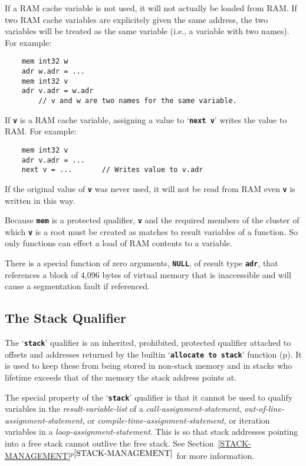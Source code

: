 \documentclass[12pt]{article}
\makeatletter
\newcommand{\TT}[1]{{\tt \bfseries #1}}
\newcommand{\ttkey}[1]{\TT{#1}\index{#1@{\tt #1}}}
\newcommand{\itemref}[1]{\ref{#1}$^{p\pageref{#1}}$}
\newcommand{\pagref}[1]{p\pageref{#1}}
\newenvironment{indpar}[1][0.3in]%
	{\begin{list}{}%
		     {\setlength{\itemsep}{0in}%
		      \setlength{\topsep}{0in}%
		      \setlength{\parsep}{1ex}%
		      \setlength{\labelwidth}{#1}%
		      \setlength{\leftmargin}{#1}%
		      \addtolength{\leftmargin}{\labelsep}}%
	 \item}%
	{\end{list}}
\makeatother
\begin{document}
If a RAM cache variable is not used, it will not actually be loaded
from RAM.  If two RAM cache variables are explicitely given the
same address, the two variables will be treated as the same variable
(i.e., a variable with two names).  For example:

\begin{indpar}\begin{verbatim}
    mem int32 w
    adr w.adr = ...
    mem int32 v
    adr v.adr = w.adr
        // v and w are two names for the same variable.
\end{verbatim}\end{indpar}

If \TT{v} is a RAM cache variable, assigning a value to `\TT{next v}'
writes the value to RAM.  For example:

\begin{indpar}\begin{verbatim}
    mem int32 v
    adr v.adr = ...
    next v = ...       // Writes value to v.adr
\end{verbatim}\end{indpar}

If the original value of \TT{v} was never used, it will not be
read from RAM even \TT{v} is written in this way.

Because \TT{mem} is a protected qualifier, \TT{v} and the required
members of the cluster of which \TT{v} is a root
must be created as matches to result variables of a function.
So only functions can effect a load of RAM contents to a variable.

There is a special function of zero arguments, \TT{NULL}, of result
type \TT{adr}, that
references a block of 4,096 bytes of virtual memory that is
inaccessible and will cause a segmentation fault if referenced.


\subsection{The Stack Qualifier}
\label{THE-STACK-QUALIFIER}

The `\ttkey{stack}' qualifier is an inherited, prohibited,
protected qualifier
attached to offsets and addresses
returned by the builtin `\TT{allocate to stack}'
function (\pagref{ALLOCATE-TO-STACK}).
It is used to keep these from being stored in
non-stack memory and in stacks who lifetime exceeds that of the
memory the stack address points at.

The special property of the `\TT{stack}' qualifier is that it cannot
be used to qualify variables in the {\em result-variable-list}
of a {\em call-assignment-statement},
{\em out-of-line-assignment-statement}, or
{\em compile-time-assignment-statement},
or iteration variables in a {\em loop-assignment-statement}.
This is so that stack addresses pointing into a free stack
cannot outlive the free stack.
See Section~\itemref{STACK-MANAGEMENT} for more information.
\end{document}

